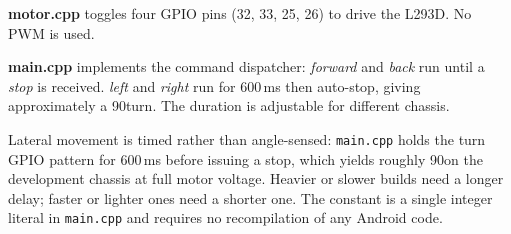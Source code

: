 \documentclass[conference]{IEEEtran}
\begin{document}
	\textbf{motor.cpp} toggles four GPIO pins (32, 33, 25, 26) to drive
	the L293D. No PWM is used.
	
	\textbf{main.cpp} implements the command dispatcher:
	\textit{forward} and \textit{back} run until a \textit{stop} is
	received. \textit{left} and \textit{right} run for 600\,ms then
	auto-stop, giving approximately a 90\degree turn. The duration is
	adjustable for different chassis.

	
	Lateral movement is timed rather than angle-sensed: \texttt{main.cpp}
	holds the turn GPIO pattern for 600\,ms before issuing a stop, which
	yields roughly 90\degree on the development chassis at full motor voltage.
	Heavier or slower builds need a longer delay; faster or lighter ones
	need a shorter one. The constant is a single integer literal in
	\texttt{main.cpp} and requires no recompilation of any Android code.
	
	
\end{document}
